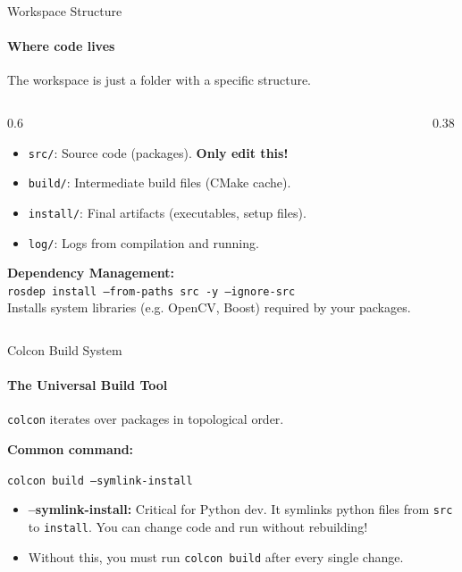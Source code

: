 \documentclass[aspectratio=169]{beamer}
\newcommand{\dbox}[1]{
\begin{mdframed}[roundcorner=3pt, backgroundcolor=yellow, linewidth=0]
\vspace{1mm}
{#1}
\vspace{1mm}
\end{mdframed}
}
\begin{document}
\begin{frame}[fragile]{Workspace Structure}
    \framesubtitle{Where code lives}
    The workspace is just a folder with a specific structure.

    \begin{columns}[T]
        \begin{column}{0.6\textwidth}
            \begin{itemize}
                \item \texttt{src/}: Source code (packages). \textbf{Only edit this!}
                \item \texttt{build/}: Intermediate build files (CMake cache).
                \item \texttt{install/}: Final artifacts (executables, setup files).
                \item \texttt{log/}: Logs from compilation and running.
            \end{itemize}
            
            \vspace{0.5em}
            \textbf{Dependency Management:}
            \\ \scriptsize \texttt{rosdep install --from-paths src -y --ignore-src}
            \\ \tiny Installs system libraries (e.g. OpenCV, Boost) required by your packages.
        \end{column}
        \begin{column}{0.38\textwidth}
            \vspace*{-2cm}
            \scriptsize
            \setlength{\DTbaselineskip}{1.5em}
        \end{column}
    \end{columns}
\end{frame}

\begin{frame}{Colcon Build System}
    \framesubtitle{The Universal Build Tool}
    \texttt{colcon} iterates over packages in topological order.
    
    \vspace{1em}
    \textbf{Common command:}
    \dbox{\texttt{colcon build --symlink-install}}
    
    \begin{itemize}
        \item \textbf{--symlink-install:} Critical for Python dev. It symlinks python files from \texttt{src} to \texttt{install}. You can change code and run without rebuilding!
        \item Without this, you must run \texttt{colcon build} after every single change.
    \end{itemize}
\end{frame}
\end{document}
